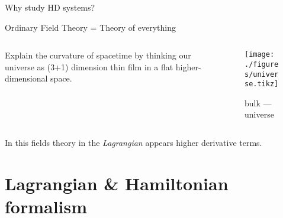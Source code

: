 \documentclass[10pt]{beamer}
\begin{document}
  \begin{frame}{Why study HD systems?}
    \begin{alertblock}{Ordinary Field Theory = Theory of everything}
    \begin{columns}
      \begin{column}{0.45\textwidth}
        Explain the curvature of spacetime by thinking our universe as (3+1)
        dimension thin film in a flat higher-dimensional space.
      \end{column}
      \begin{column}{0.45\textwidth}
        \begin{figure}
          \texttt{[image: ./figures/universe.tikz]}
          \caption[labelformat=empty]{bulk ---
          \alert{universe}}\label{fig:Universe}
        \end{figure}
      \end{column}
    \end{columns}
    \end{alertblock}
    In this fields theory in the \emph{Lagrangian} appears \alert{higher
    derivative terms}.
  \end{frame}

  \section{Lagrangian \& Hamiltonian formalism}
\end{document}
